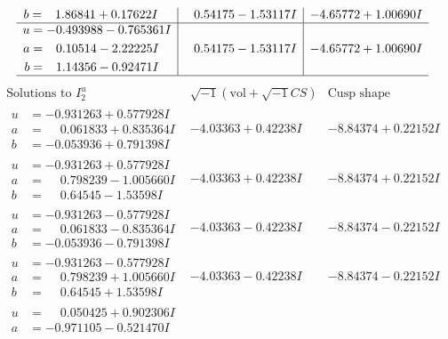 \documentclass[1p]{elsarticle_modified}
\theoremstyle{definition}
\newcommand{\I}{\sqrt{-1}}
\begin{document}
$$\begin{array}{c|c|c}
\begin{aligned}
b &= \phantom{-}1.86841 + 0.17622 I\end{aligned}
 & \phantom{-}0.54175 - 1.53117 I & -4.65772 + 1.00690 I \\ \hline\begin{aligned}
u &= -0.493988 - 0.765361 I \\
a &= \phantom{-}0.10514 - 2.22225 I \\
b &= \phantom{-}1.14356 - 0.92471 I\end{aligned}
 & \phantom{-}0.54175 - 1.53117 I & -4.65772 + 1.00690 I\\
 \hline 
 \end{array}$$\newpage$$\begin{array}{c|c|c}  
\text{Solutions to }I^u_{2}& \I (\text{vol} + \sqrt{-1}CS) & \text{Cusp shape}\\
 \hline 
\begin{aligned}
u &= -0.931263 + 0.577928 I \\
a &= \phantom{-}0.061833 + 0.835364 I \\
b &= -0.053936 + 0.791398 I\end{aligned}
 & -4.03363 + 0.42238 I & -8.84374 + 0.22152 I \\ \hline\begin{aligned}
u &= -0.931263 + 0.577928 I \\
a &= \phantom{-}0.798239 - 1.005660 I \\
b &= \phantom{-}0.64545 - 1.53598 I\end{aligned}
 & -4.03363 + 0.42238 I & -8.84374 + 0.22152 I \\ \hline\begin{aligned}
u &= -0.931263 - 0.577928 I \\
a &= \phantom{-}0.061833 - 0.835364 I \\
b &= -0.053936 - 0.791398 I\end{aligned}
 & -4.03363 - 0.42238 I & -8.84374 - 0.22152 I \\ \hline\begin{aligned}
u &= -0.931263 - 0.577928 I \\
a &= \phantom{-}0.798239 + 1.005660 I \\
b &= \phantom{-}0.64545 + 1.53598 I\end{aligned}
 & -4.03363 - 0.42238 I & -8.84374 - 0.22152 I \\ \hline\begin{aligned}
u &= \phantom{-}0.050425 + 0.902306 I \\
a &= -0.971105 - 0.521470 I \\

\end{aligned}
\end{array}$$
\end{document}
